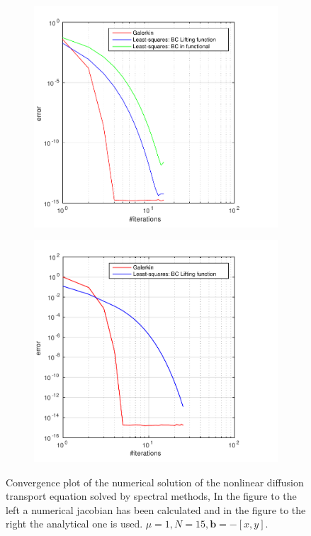 \begin{figure}[h]
  \centering
  \begin{subfigure}[b]{0.48\textwidth}
	\includegraphics[width=\textwidth]{Figures/Spec_Nonlin_Convergence_Jnum.pdf}
  \end{subfigure}%
  \quad
  \begin{subfigure}[b]{0.48\textwidth}
	\includegraphics[width=\textwidth]{Figures/Spec_Nonlin_Convergence.pdf}
  \end{subfigure}%
  \vspace{-0.1\baselineskip}
	\caption{Convergence plot of the numerical solution of the nonlinear diffusion transport equation solved by spectral methods, In the figure to the left a numerical jacobian has been calculated and in the figure to the right the analytical one is used. $\mu = 1,N=15,\mathbf{b} = -[x,y]$.}
  \label{fig:SurfDiffTransPositiveFEM}
\end{figure}
